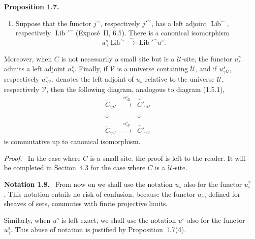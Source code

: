 \documentclass[11pt]{article}
\newcommand{\U}{\mathcal{U}}
\newcommand{\V}{\mathcal{V}}
\newenvironment{statement}[1]{\par\medskip\noindent\textbf{#1.}\ }{\par\medskip}
\newenvironment{remarktext}[1]{\par\medskip\noindent\textbf{#1.}\ }{\par\medskip}
\newenvironment{prooftext}{\par\noindent\emph{Proof.}\ }{\par\medskip}
\begin{document}
\begin{statement}{Proposition 1.7}
\begin{enumerate}[label=\arabic*)]
\item Suppose that the functor \(j^{\sim}\), respectively \({j'}^{\sim}\), has a left adjoint \(\operatorname{Lib}^{\sim}\), respectively \({\operatorname{Lib}'}^{\sim}\) (Expos\'e~II, 6.5). There is a canonical isomorphism
\[
u^s_\gamma\operatorname{Lib}^{\sim}\xrightarrow{\sim}{\operatorname{Lib}'}^{\sim}u^s.
\]
\end{enumerate}
Moreover, when \(C\) is not necessarily a small site but is a \(\U\)-site, the functor \(u_s^\gamma\) admits a left adjoint \(u^s_\gamma\). Finally, if \(\V\) is a universe containing \(\U\), and if \(u^s_{\gamma\U}\), respectively \(u^s_{\gamma\V}\), denotes the left adjoint of \(u_s\) relative to the universe \(\U\), respectively \(\V\), then the following diagram, analogous to diagram (1.5.1),
\[
\begin{array}{ccc}
\widetilde C_{\gamma\U}&\xrightarrow{\ u^s_{\gamma\U}\ }&\widetilde {C'}_{\gamma\U}\\
\downarrow&&\downarrow\\
\widetilde C_{\gamma\V}&\xrightarrow{\ u^s_{\gamma\V}\ }&\widetilde {C'}_{\gamma\V}
\end{array}
\tag{1.7.1}
\]
is commutative up to canonical isomorphism.
\end{statement}

\begin{prooftext}
In the case where \(C\) is a small site, the proof is left to the reader. It will be completed in Section~4.3 for the case where \(C\) is a \(\U\)-site.
\end{prooftext}

\begin{remarktext}{Notation 1.8}
From now on we shall use the notation \(u_s\) also for the functor \(u_s^\gamma\). This notation entails no risk of confusion, because the functor \(u_s\), defined for sheaves of sets, commutes with finite projective limits.
\end{remarktext}

Similarly, when \(u^s\) is left exact, we shall use the notation \(u^s\) also for the functor \(u^s_\gamma\). This abuse of notation is justified by Proposition~1.7(4).
\end{document}
